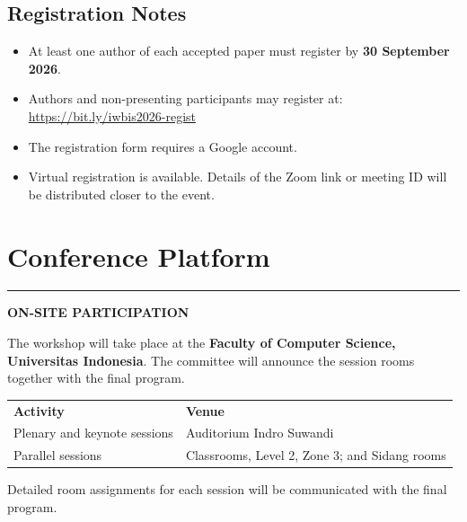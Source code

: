 \documentclass[10pt,a4paper]{article}
\begin{document}
\vspace{0.8em}

\subsection[Registration Notes]{\color{conf}Registration Notes}

\begin{itemize}
    \setlength{\itemsep}{0.4em}
    \item At least one author of each accepted paper must register by \textbf{30 September 2026}.
    \item Authors and non-presenting participants may register at:
    \url{https://bit.ly/iwbis2026-regist}
    \item The registration form requires a Google account.
    \item Virtual registration is available. Details of the Zoom link or meeting ID will be distributed closer to the event.
\end{itemize}

\normalsize


\clearpage
\section{\textbf{Conference Platform}}
\color{conf}\rule{\linewidth}{1pt}\color{black}
\vspace{0.8em}

\begin{minipage}{\linewidth}
\textbf{\color{conf}ON-SITE PARTICIPATION}

\vspace{0.4em}

The workshop will take place at the \textbf{Faculty of Computer Science, Universitas Indonesia}. The committee will announce the session rooms together with the final program.

\vspace{0.6em}

\renewcommand{\arraystretch}{1.25}
\setlength{\tabcolsep}{10pt}

\begin{center}
\begin{tabularx}{0.95\textwidth}{
    >{\raggedright\arraybackslash}p{4.3cm}
    >{\raggedright\arraybackslash}X
}
\rowcolor{lightgraybg}
\textbf{Activity} & \textbf{Venue} \\

Plenary and keynote sessions &
Auditorium Indro Suwandi \\

Parallel sessions &
Classrooms, Level 2, Zone 3; and Sidang rooms \\
\end{tabularx}
\end{center}

\vspace{0.4em}

Detailed room assignments for each session will be communicated with the final program.

\end{minipage}
\end{document}
